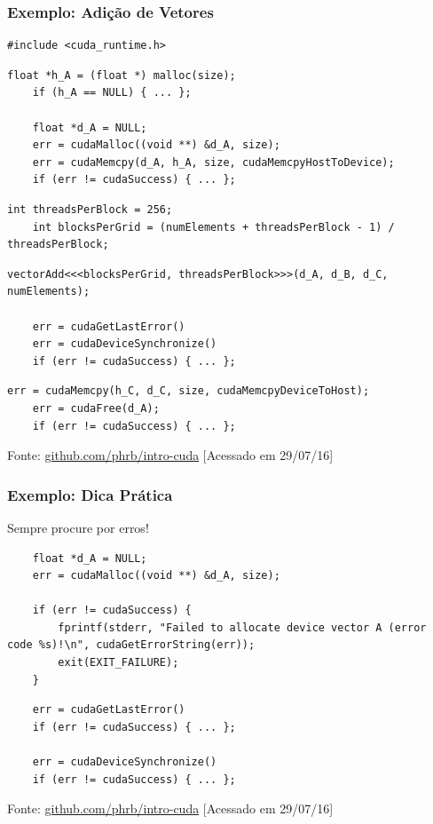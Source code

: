 \documentclass[10pt, compress]{beamer}
\begin{document}
\begin{frame}[fragile]
    \frametitle{Exemplo: Adição de Vetores}
    \begin{lstlisting}[basicstyle=\ttfamily\scriptsize]
    #include <cuda_runtime.h>
    \end{lstlisting}
    \pause
    \begin{lstlisting}[basicstyle=\ttfamily\scriptsize]
    float *h_A = (float *) malloc(size);
    if (h_A == NULL) { ... };

    float *d_A = NULL;
    err = cudaMalloc((void **) &d_A, size);
    err = cudaMemcpy(d_A, h_A, size, cudaMemcpyHostToDevice);
    if (err != cudaSuccess) { ... };
    \end{lstlisting}
    \pause
    \begin{lstlisting}[basicstyle=\ttfamily\scriptsize]
    int threadsPerBlock = 256;
    int blocksPerGrid = (numElements + threadsPerBlock - 1) / threadsPerBlock;
    \end{lstlisting}
    \pause
    \begin{lstlisting}[basicstyle=\ttfamily\scriptsize]
    vectorAdd<<<blocksPerGrid, threadsPerBlock>>>(d_A, d_B, d_C, numElements);

    err = cudaGetLastError()
    err = cudaDeviceSynchronize()
    if (err != cudaSuccess) { ... };
    \end{lstlisting}
    \pause
    \begin{lstlisting}[basicstyle=\ttfamily\scriptsize]
    err = cudaMemcpy(h_C, d_C, size, cudaMemcpyDeviceToHost);
    err = cudaFree(d_A);
    if (err != cudaSuccess) { ... };
    \end{lstlisting}

    \vfill

    \begin{center}
        \tiny{Fonte: \url{github.com/phrb/intro-cuda} [Acessado em 29/07/16]}
    \end{center}
\end{frame}

\begin{frame}[fragile]
    \frametitle{Exemplo: Dica Prática}
    \alert{Sempre} procure por erros!

    \begin{lstlisting}
    float *d_A = NULL;
    err = cudaMalloc((void **) &d_A, size);

    if (err != cudaSuccess) {
        fprintf(stderr, "Failed to allocate device vector A (error code %s)!\n", cudaGetErrorString(err));
        exit(EXIT_FAILURE);
    }
    \end{lstlisting}
    \pause
    \begin{lstlisting}
    err = cudaGetLastError()
    if (err != cudaSuccess) { ... };

    err = cudaDeviceSynchronize()
    if (err != cudaSuccess) { ... };
    \end{lstlisting}

    \begin{center}
        \tiny{Fonte: \url{github.com/phrb/intro-cuda} [Acessado em 29/07/16]}
    \end{center}
\end{frame}
\end{document}
